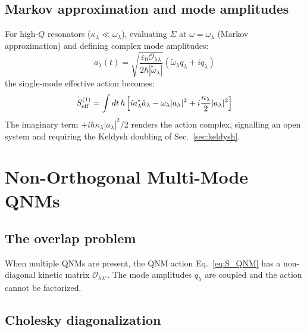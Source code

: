 \documentclass[12pt]{article}
\newcommand{\tomega}{\tilde{\omega}}
\begin{document}
\subsection{Markov approximation and mode amplitudes}

For high-$Q$ resonators ($\kappa_\lambda\ll\omega_\lambda$), evaluating
$\Sigma$ at $\omega=\omega_\lambda$ (Markov approximation) and defining
complex mode amplitudes:
\begin{equation}
  a_\lambda(t) = \sqrt{\frac{\varepsilon_0\mathcal{O}_{\lambda\lambda}}
  {2\hbar|\tomega_\lambda|}}\left(\tomega_\lambda q_\lambda+i\dot{q}_\lambda\right)
  \label{eq:mode_amp}
\end{equation}
the single-mode effective action becomes:
\begin{equation}
  S_{\rm eff}^{(1)} = \int dt\,\hbar
  \left[ia_\lambda^*\dot{a}_\lambda
  -\omega_\lambda|a_\lambda|^2
  +i\frac{\kappa_\lambda}{2}|a_\lambda|^2\right]
  \label{eq:eff_action_1mode}
\end{equation}
The imaginary term $+i\hbar\kappa_\lambda|a_\lambda|^2/2$ renders the
action complex, signalling an open system and requiring the Keldysh
doubling of Sec.~\ref{sec:keldysh}.

\section{Non-Orthogonal Multi-Mode QNMs}
\label{sec:nonorthogonal}

\subsection{The overlap problem}

When multiple QNMs are present, the QNM action Eq.~\eqref{eq:S_QNM} has
a non-diagonal kinetic matrix $\mathcal{O}_{\lambda\lambda'}$.  The mode
amplitudes $q_\lambda$ are coupled and the action cannot be factorized.

\subsection{Cholesky diagonalization}
\end{document}

